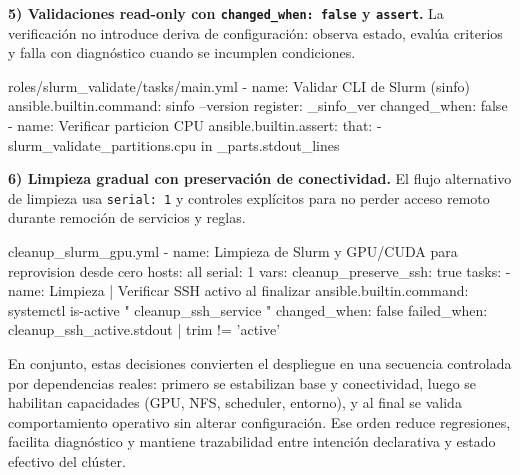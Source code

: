 \textbf{5) Validaciones read-only con \texttt{changed\_when: false} y \texttt{assert}.} La verificación no introduce deriva de configuración: observa estado, evalúa criterios y falla con diagnóstico cuando se incumplen condiciones.

\begin{filecode}{roles/slurm_validate/tasks/main.yml}
- name: Validar CLI de Slurm (sinfo)
  ansible.builtin.command: sinfo --version
  register: _sinfo_ver
  changed_when: false
- name: Verificar particion CPU
  ansible.builtin.assert:
    that:
      - slurm_validate_partitions.cpu in _parts.stdout_lines
\end{filecode}

\textbf{6) Limpieza gradual con preservación de conectividad.} El flujo alternativo de limpieza usa \texttt{serial: 1} y controles explícitos para no perder acceso remoto durante remoción de servicios y reglas.

\begin{filecode}{cleanup_slurm_gpu.yml}
- name: Limpieza de Slurm y GPU/CUDA para reprovision desde cero
  hosts: all
  serial: 1
  vars:
    cleanup_preserve_ssh: true
  tasks:
    - name: Limpieza | Verificar SSH activo al finalizar
      ansible.builtin.command: systemctl is-active "{{ cleanup_ssh_service }}"
      changed_when: false
      failed_when: cleanup_ssh_active.stdout | trim != 'active'
\end{filecode}

En conjunto, estas decisiones convierten el despliegue en una secuencia controlada por dependencias reales: primero se estabilizan base y conectividad, luego se habilitan capacidades (GPU, NFS, scheduler, entorno), y al final se valida comportamiento operativo sin alterar configuración. Ese orden reduce regresiones, facilita diagnóstico y mantiene trazabilidad entre intención declarativa y estado efectivo del clúster.
